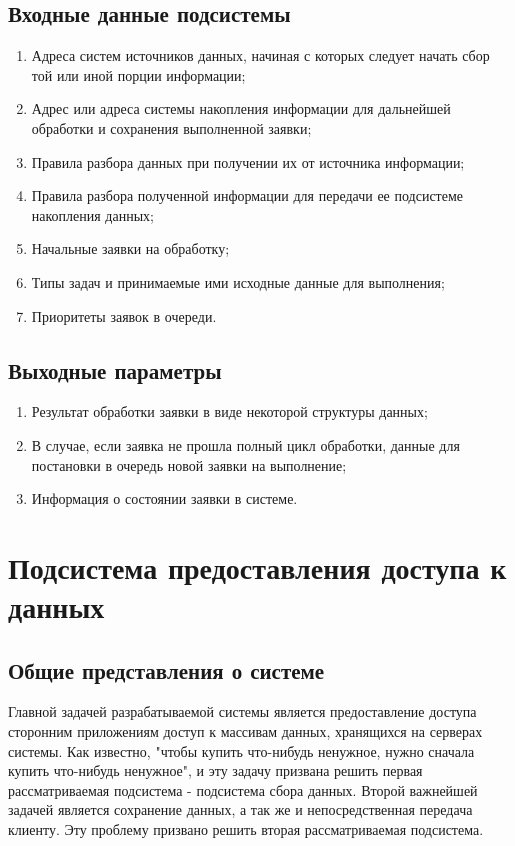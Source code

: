 \subsection{Входные данные подсистемы}

\begin{enumerate}
 \item Адреса систем источников данных, начиная с которых следует начать сбор той или иной порции информации;
 \item Адрес или адреса системы накопления информации для дальнейшей обработки и сохранения выполненной заявки;
 \item Правила разбора данных при получении их от источника информации;
 \item Правила разбора полученной информации для передачи ее подсистеме накопления данных;
 \item Начальные заявки на обработку;
 \item Типы задач и принимаемые ими исходные данные для выполнения;
 \item Приоритеты заявок в очереди.
\end{enumerate}

\subsection{Выходные параметры}
\begin{enumerate}
 \item Результат обработки заявки в виде некоторой структуры данных;
 \item В случае, если заявка не прошла полный цикл обработки, данные для постановки в очередь новой заявки на выполнение;
 \item Информация о состоянии заявки в системе.
\end{enumerate}

\section{Подсистема предоставления доступа к данных}

\subsection{Общие представления о системе}

Главной задачей разрабатываемой системы является предоставление доступа сторонним приложениям доступ к массивам данных, хранящихся на серверах системы. Как известно, "чтобы купить что-нибудь ненужное, нужно сначала купить что-нибудь ненужное", и эту задачу призвана решить первая рассматриваемая подсистема - подсистема сбора данных. Второй важнейшей задачей является сохранение данных, а так же и непосредственная передача клиенту. Эту проблему призвано решить вторая рассматриваемая подсистема.

